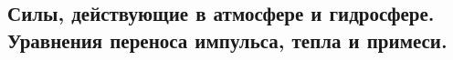 \subsection{Силы, действующие в атмосфере и гидросфере. Уравнения переноса импульса, тепла и примеси.}
